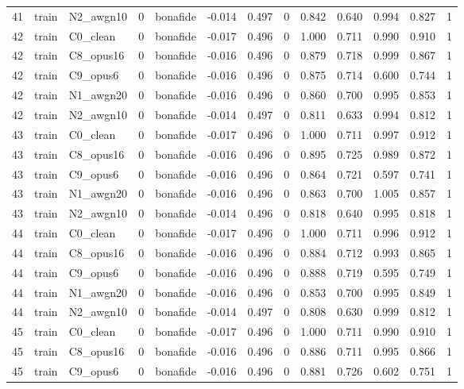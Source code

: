 \begin{tabular}{rllrlrrrrrrrr}
41 & train & N2_awgn10 & 0 & bonafide & -0.014 & 0.497 & 0 & 0.842 & 0.640 & 0.994 & 0.827 & 1 \\
42 & train & C0_clean & 0 & bonafide & -0.017 & 0.496 & 0 & 1.000 & 0.711 & 0.990 & 0.910 & 1 \\
42 & train & C8_opus16 & 0 & bonafide & -0.016 & 0.496 & 0 & 0.879 & 0.718 & 0.999 & 0.867 & 1 \\
42 & train & C9_opus6 & 0 & bonafide & -0.016 & 0.496 & 0 & 0.875 & 0.714 & 0.600 & 0.744 & 1 \\
42 & train & N1_awgn20 & 0 & bonafide & -0.016 & 0.496 & 0 & 0.860 & 0.700 & 0.995 & 0.853 & 1 \\
42 & train & N2_awgn10 & 0 & bonafide & -0.014 & 0.497 & 0 & 0.811 & 0.633 & 0.994 & 0.812 & 1 \\
43 & train & C0_clean & 0 & bonafide & -0.017 & 0.496 & 0 & 1.000 & 0.711 & 0.997 & 0.912 & 1 \\
43 & train & C8_opus16 & 0 & bonafide & -0.016 & 0.496 & 0 & 0.895 & 0.725 & 0.989 & 0.872 & 1 \\
43 & train & C9_opus6 & 0 & bonafide & -0.016 & 0.496 & 0 & 0.864 & 0.721 & 0.597 & 0.741 & 1 \\
43 & train & N1_awgn20 & 0 & bonafide & -0.016 & 0.496 & 0 & 0.863 & 0.700 & 1.005 & 0.857 & 1 \\
43 & train & N2_awgn10 & 0 & bonafide & -0.014 & 0.496 & 0 & 0.818 & 0.640 & 0.995 & 0.818 & 1 \\
44 & train & C0_clean & 0 & bonafide & -0.017 & 0.496 & 0 & 1.000 & 0.711 & 0.996 & 0.912 & 1 \\
44 & train & C8_opus16 & 0 & bonafide & -0.016 & 0.496 & 0 & 0.884 & 0.712 & 0.993 & 0.865 & 1 \\
44 & train & C9_opus6 & 0 & bonafide & -0.016 & 0.496 & 0 & 0.888 & 0.719 & 0.595 & 0.749 & 1 \\
44 & train & N1_awgn20 & 0 & bonafide & -0.016 & 0.496 & 0 & 0.853 & 0.700 & 0.995 & 0.849 & 1 \\
44 & train & N2_awgn10 & 0 & bonafide & -0.014 & 0.497 & 0 & 0.808 & 0.630 & 0.999 & 0.812 & 1 \\
45 & train & C0_clean & 0 & bonafide & -0.017 & 0.496 & 0 & 1.000 & 0.711 & 0.990 & 0.910 & 1 \\
45 & train & C8_opus16 & 0 & bonafide & -0.016 & 0.496 & 0 & 0.886 & 0.711 & 0.995 & 0.866 & 1 \\
45 & train & C9_opus6 & 0 & bonafide & -0.016 & 0.496 & 0 & 0.881 & 0.726 & 0.602 & 0.751 & 1 \\

\end{tabular}

